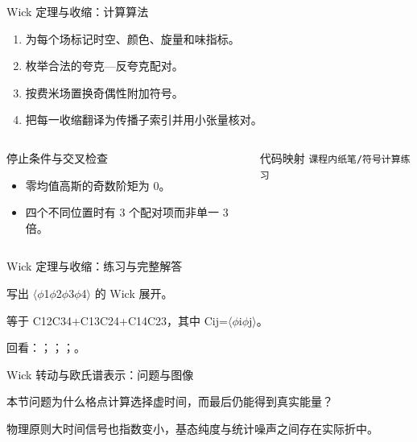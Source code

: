 \begin{frame}[t]{Wick 定理与收缩：计算算法}
\footnotesize
{}\begin{enumerate}
\item 为每个场标记时空、颜色、旋量和味指标。
\item 枚举合法的夸克—反夸克配对。
\item 按费米场置换奇偶性附加符号。
\item 把每一收缩翻译为传播子索引并用小张量核对。
\end{enumerate}\begin{columns}[T,onlytextwidth]
\begin{block}{停止条件与交叉检查}\scriptsize\begin{itemize}
\item[\CheckMark] 零均值高斯的奇数阶矩为 0。
\item[\CheckMark] 四个不同位置时有 3 个配对项而非单一 3 倍。
\end{itemize}\end{block}
\begin{block}{代码映射}
\scriptsize \texttt{课程内纸笔/\allowbreak{}符号计算练习}
\end{block}\end{columns}\end{frame}

\begin{frame}[t]{Wick 定理与收缩：练习与完整解答}
\footnotesize
\begin{block}{}写出 \ensuremath{\langle}\ensuremath{\phi}1\ensuremath{\phi}2\ensuremath{\phi}3\ensuremath{\phi}4\ensuremath{\rangle} 的 Wick 展开。\end{block}
\begin{exampleblock}{}等于 C12C34+C13C24+C14C23，其中 Cij=\ensuremath{\langle}\ensuremath{\phi}i\ensuremath{\phi}j\ensuremath{\rangle}。\end{exampleblock}
\vfill
\scriptsize 回看：；；；。
\end{frame}

\begin{frame}[t]{Wick 转动与欧氏谱表示：问题与图像}
\footnotesize
\begin{block}{本节问题}为什么格点计算选择虚时间，而最后仍能得到真实能量？\end{block}
\begin{block}{物理原则}\quad 大时间信号也指数变小，基态纯度与统计噪声之间存在实际折中。\end{block}
\end{frame}

